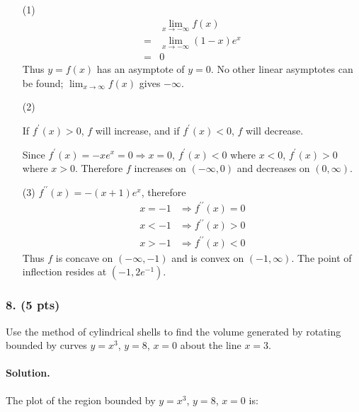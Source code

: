 \begin{itemize}
	\item [(1)]{
		\begin{align*}
		&\lim_{x\rightarrow -\infty} f\left(x\right)\\
		=& \lim_{x\rightarrow -\infty} \left(1-x\right)e^x\\
		=& 0
		\end{align*}
		Thus $y=f\left(x\right)$ has an asymptote of $y=0$. No other linear asymptotes can be found; $\lim_{x\rightarrow \infty} f\left(x\right)$ gives $-\infty$.
	}
	\item [(2)]{
		If $f^\prime\left(x\right) > 0$, $f$ will increase, and if $f^\prime\left(x\right) < 0$, $f$ will decrease.
		
		Since $f^\prime\left(x\right) = -xe^x = 0 \Rightarrow x = 0$, $f^\prime\left(x\right) < 0$ where $x < 0$, $f^\prime\left(x\right) > 0$ where $x > 0$. Therefore $f$ increases on $\left(-\infty, 0\right)$ and decreases on  $\left(0, \infty\right)$.
	}
	\item [(3)]{
		$f^{\prime\prime}\left(x\right)=-\left(x+1\right)e^x$, therefore
		\begin{align*}
		x = -1 &\Rightarrow f^{\prime\prime}\left(x\right) = 0\\
		x < -1 &\Rightarrow f^{\prime\prime}\left(x\right) > 0\\
		x > -1 &\Rightarrow f^{\prime\prime}\left(x\right) < 0
		\end{align*}
		Thus $f$ is concave on $\left(-\infty, -1\right)$ and is convex on $\left(-1, \infty\right)$. The point of inflection resides at $\left(-1, 2e^{-1}\right)$.
	}
\end{itemize}

\subsubsection{8. (5 pts)} Use the method of cylindrical shells to find the volume generated by rotating bounded by curves $y = x^3$, $y = 8$, $x = 0$ about the line $x = 3$.

\paragraph{Solution.} The plot of the region bounded by $y = x^3$, $y = 8$, $x = 0$ is:
\begin{center}
\end{center}

